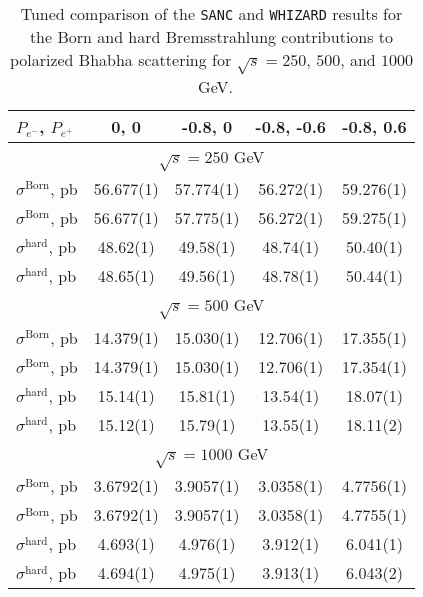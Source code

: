 \documentclass[%
 reprint,
amsmath,
amssymb,
 aps,
 prb,
 floatfix,
]{revtex4-1}
\begin{document}
\begin{table}[b]
\caption{Tuned comparison of the {\tt SANC} and {\tt WHIZARD} results for the Born and 
hard Bremsstrahlung contributions to polarized Bhabha scattering
for $\sqrt{s} = 250$, $500$, and $1000$~GeV.}
\label{sanc_vs_whiz_hard}
\begin{ruledtabular}
\begin{tabular}{lcccc}
$P_{e^-}$, $P_{e^+}$ & 0, 0 & -0.8, 0 & -0.8, -0.6 & -0.8, 0.6\\
\hline
\multicolumn{5}{c}{$\sqrt{s} = 250$ GeV}\\
\hline
$\sigma^{\text{Born}}$, pb & 56.677(1) & 57.774(1) & 56.272(1) & 59.276(1)\\
$\sigma^{\text{Born}}$, pb & 56.677(1) & 57.775(1) & 56.272(1) & 59.275(1)\\
$\sigma^{\text{hard}}$, pb  & 48.62(1) & 49.58(1) & 48.74(1) & 50.40(1)\\
$\sigma^{\text{hard}}$, pb  & 48.65(1) & 49.56(1) & 48.78(1) & 50.44(1)\\
\hline
\multicolumn{5}{c}{$\sqrt{s} = 500$ GeV}\\
\hline
$\sigma^{\text{Born}}$, pb  & 14.379(1) & 15.030(1) & 12.706(1) & 17.355(1)\\
$\sigma^{\text{Born}}$, pb  & 14.379(1) & 15.030(1) & 12.706(1) & 17.354(1)\\
$\sigma^{\text{hard}}$, pb  & 15.14(1)  & 15.81(1) & 13.54(1) & 18.07(1)\\
$\sigma^{\text{hard}}$, pb  & 15.12(1)  & 15.79(1) & 13.55(1) & 18.11(2)\\
\hline
\multicolumn{5}{c}{$\sqrt{s} = 1000$ GeV}\\
\hline
$\sigma^{\text{Born}}$, pb  & 3.6792(1) & 3.9057(1) & 3.0358(1) & 4.7756(1)\\
$\sigma^{\text{Born}}$, pb  & 3.6792(1) & 3.9057(1) & 3.0358(1) & 4.7755(1)\\
$\sigma^{\text{hard}}$, pb  & 4.693(1)  & 4.976(1)  & 3.912(1)  & 6.041(1)\\
$\sigma^{\text{hard}}$, pb  & 4.694(1)  & 4.975(1)  & 3.913(1)  & 6.043(2)\\
\end{tabular}
\end{ruledtabular}
\end{table}
\end{document}
